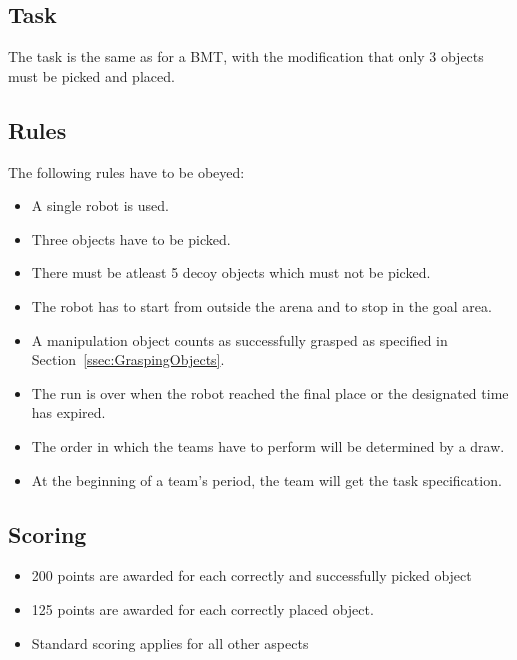 
\subsection{Task}

The task is the same as for a BMT, with the modification that only 3 objects must be picked and placed.

\subsection{Rules}
The following rules have to be obeyed:

\begin{itemize}
\item A single robot is used.
\item Three objects have to be picked.
\item There must be atleast 5 decoy objects which must not be picked.
\item The robot has to start from outside the arena and to stop in the goal area.
\item A manipulation object counts as successfully grasped as specified in Section~\ref{ssec:GraspingObjects}.
\item The run is over when the robot reached the final place or the designated time has expired.
\item The order in which the teams have to perform will be determined by a draw.
\item At the beginning of a team's period, the team will get the task specification.
\end{itemize}

\subsection{Scoring}
\begin{itemize}
\item 200 points are awarded for each correctly and successfully picked object
\item 125 points are awarded for each correctly placed object.
\item Standard scoring applies for all other aspects
\end{itemize}
